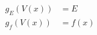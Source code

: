 \documentclass[10pt]{article}
\begin{document}
\begin{align*}g_E\left(V(x)\right) &= E \\
g_f\left(V(x)\right) &= f(x)
\end{align*}
\end{document}
